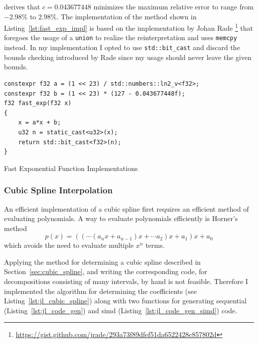 \documentclass[a4paper, 11pt]{memoir}
\begin{document}
    \citeauthor{fast_exp} derives that $c = 0.043677448$ minimizes the maximum relative error to range from $-2.98\%$ to
    $2.98\%$. The implementation of the method shown in Listing~\ref{lst:fast_exp_impl} is based on the implementation
    by Johan Rade \footnote{\href{https://gist.github.com/jrade/293a73f89dfef51da6522428c857802d}{https://gist.github.com/jrade/293a73f89dfef51da6522428c857802d}}
    that foregoes the usage of a \texttt{union} to realize the reinterpretation and uses \texttt{memcpy}
    instead. In my implementation I opted to use \texttt{std::bit_cast} and discard the bounds checking
    introduced by Rade since my usage should never leave the given bounds.

    \begin{listing}[t]
        \begin{verbatim}
constexpr f32 a = (1 << 23) / std::numbers::ln2_v<f32>;
constexpr f32 b = (1 << 23) * (127 - 0.043677448f);
f32 fast_exp(f32 x)
{
    x = a*x + b;
    u32 n = static_cast<u32>(x);
    return std::bit_cast<f32>(n);
}
        \end{verbatim}
        \caption{Fast Exponential Function Implementations}
        \label{lst:fast_exp_impl}
    \end{listing}
    
    \subsubsection{Cubic Spline Interpolation}
    \label{sec:impl_cubic_spline}
    An efficient implementation of a cubic spline first requires an efficient method of evaluating polynomials. A way to
    evaluate polynomials efficiently is Horner's method
    \begin{equation}
        p(x) = \left(\left(\cdots\left(a_nx + a_{n-1}\right)x + \cdots a_2\right)x + a_1\right)x + a_0
        \label{eq:horners_method}
    \end{equation}
    which avoids the need to evaluate multiple $x^n$ terms.

    Applying the method for determining a cubic spline described in Section~\ref{sec:cubic_spline}, and writing the
    corresponding code, for decompositions consisting of many intervals, by hand is not feasible. Therefore I implemented 
    the algorithm for determining the coefficients (see Listing~\ref{lst:jl_cubic_spline}) along with two functions for
    generating sequential (Listing~\ref{lst:jl_code_gen}) and \gls{simd} (Listing~\ref{lst:jl_code_gen_simd}) code.
    
\end{document}
